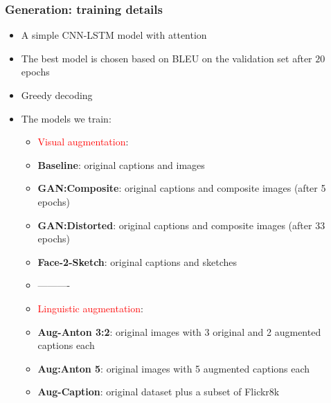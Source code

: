 \documentclass[aspectratio=1610]{beamer} %
\begin{document}
\begin{frame}
\frametitle{Generation: training details}
\begin{itemize}

	\item A simple CNN-LSTM model with attention
	\item The best model is chosen based on BLEU on the validation set after $20$ epochs
	\item Greedy decoding
	\pause
	\item The models we train:
		\begin{itemize}
			\item \textcolor{red}{Visual augmentation}:
			\item \textbf{Baseline}: original captions and images
			\item \textbf{GAN:Composite}: original captions and composite images (after 5 epochs)
			\item \textbf{GAN:Distorted}: original captions and composite images (after 33 epochs)
			\item \textbf{Face-2-Sketch}: original captions and sketches  
			\item[] ----------
			\item \textcolor{red}{Linguistic augmentation}:
			\item \textbf{Aug-Anton 3:2}: original images with 3 original and 2 augmented captions each
			\item \textbf{Aug:Anton 5}: original images with 5 augmented captions each
			\item \textbf{Aug-Caption}: original dataset plus a subset of Flickr8k
		\end{itemize}

\end{itemize}
\end{frame}



\end{document}
